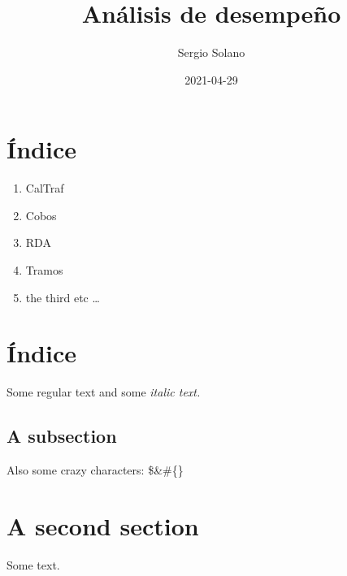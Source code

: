 \documentclass{article}%
\title{Análisis de desempeño}%
\author{Sergio Solano}%
\date{2021{-}04{-}29}%
\begin{document}
%
\normalsize%
\maketitle%
\section{Índice}%
\label{sec:ndice}%
\begin{enumerate}[label=\alph*),start=1]%
\item%
CalTraf%
\item%
Cobos%
\item%
RDA%
\item%
Tramos%
\item%
the third etc \ldots%
\end{enumerate}

%
\section{Índice}%
\label{sec:ndice}%
Some regular text and some %
\textit{italic text. }%
\subsection{A subsection}%
\label{subsec:Asubsection}%
Also some crazy characters: \$\&\#\{\}

%
\section{A second section}%
\label{sec:Asecondsection}%
Some text.

%
\end{document}

